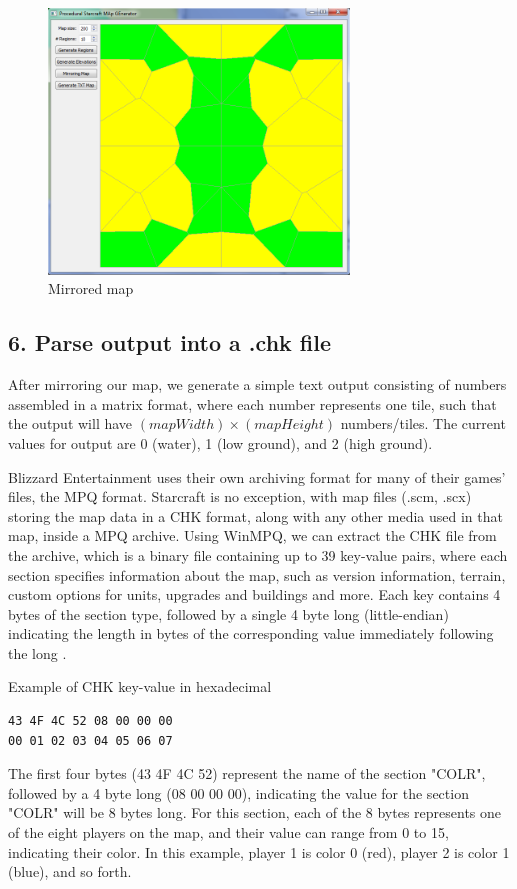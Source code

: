 \documentclass[letterpaper]{article}
\begin{document}
\begin{figure}[ht]
    \centering
    \includegraphics[width=8cm]{PCG04.png}
    \caption{Mirrored map}
    \label{fig:mirrored-map}
\end{figure}

\subsection{6. Parse output into a .chk file}
After mirroring our map, we generate a simple text output consisting of numbers assembled in a matrix format, where each number represents one tile, such that the output will have $(mapWidth) \times (mapHeight)$ numbers/tiles. The current values for output are 0 (water), 1 (low ground), and 2 (high ground).

Blizzard Entertainment uses their own archiving format for many of their games' files, the MPQ format. Starcraft is no exception, with map files (.scm, .scx) storing the map data in a CHK format, along with any other media used in that map, inside a MPQ archive. Using WinMPQ, we can extract the CHK file from the archive, which is a binary file containing up to 39 key-value pairs, where each section specifies information about the map, such as version information, terrain, custom options for units, upgrades and buildings and more. Each key contains 4 bytes of the section type, followed by a single 4 byte long (little-endian) indicating the length in bytes of the corresponding value immediately following the long \cite{Olbrantz}.

Example of CHK key-value in hexadecimal
\begin{verbatim}
43 4F 4C 52 08 00 00 00
00 01 02 03 04 05 06 07
\end{verbatim}

The first four bytes (43 4F 4C 52) represent the name of the section "COLR", followed by a 4 byte long (08 00 00 00), indicating the value for the section "COLR" will be 8 bytes long. For this section, each of the 8 bytes represents one of the eight players on the map, and their value can range from 0 to 15, indicating their color. In this example, player 1 is color 0 (red), player 2 is color 1 (blue), and so forth.
\end{document}
